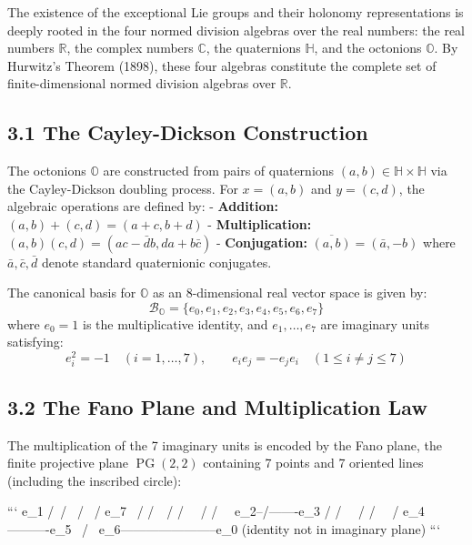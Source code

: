 \documentclass[11pt,twoside,openright]{amsbook}
\begin{document}
The existence of the exceptional Lie groups and their holonomy representations is deeply rooted in the four normed division algebras over the real numbers: the real numbers $\mathbb{R}$, the complex numbers $\mathbb{C}$, the quaternions $\mathbb{H}$, and the octonions $\mathbb{O}$. By Hurwitz's Theorem (1898), these four algebras constitute the complete set of finite-dimensional normed division algebras over $\mathbb{R}$.

\subsection{3.1 The Cayley-Dickson Construction}

The octonions $\mathbb{O}$ are constructed from pairs of quaternions $(a, b) \in \mathbb{H} \times \mathbb{H}$ via the Cayley-Dickson doubling process. For $x = (a, b)$ and $y = (c, d)$, the algebraic operations are defined by:
- \textbf{Addition:} $(a, b) + (c, d) = (a + c, b + d)$
- \textbf{Multiplication:} $(a, b)(c, d) = (ac - \bar{d}b, da + b\bar{c})$
- \textbf{Conjugation:} $\overline{(a, b)} = (\bar{a}, -b)$
where $\bar{a}, \bar{c}, \bar{d}$ denote standard quaternionic conjugates.

The canonical basis for $\mathbb{O}$ as an 8-dimensional real vector space is given by:
$$\mathcal{B}_{\mathbb{O}} = \{e_0, e_1, e_2, e_3, e_4, e_5, e_6, e_7\}$$
where $e_0 = 1$ is the multiplicative identity, and $e_1, \dots, e_7$ are imaginary units satisfying:
$$e_i^2 = -1 \quad (i = 1, \dots, 7), \qquad e_i e_j = -e_j e_i \quad (1 \le i \ne j \le 7)$$

\subsection{3.2 The Fano Plane and Multiplication Law}

The multiplication of the 7 imaginary units is encoded by the Fano plane, the finite projective plane $\operatorname{PG}(2, 2)$ containing 7 points and 7 oriented lines (including the inscribed circle):

```
                                  e_1
                                  /\
                                 /  \
                                /    \
                               /  e_7 \
                              /   /\   \
                             /   /  \   \
                            /   /    \   \
                          e_2--/------\--e_3
                          /   /        \   \
                         /   /          \   \
                        /   e_4----------e_5 \
                       /                      \
                     e_6-----------------------e_0 (identity not in imaginary plane)
```
\end{document}
